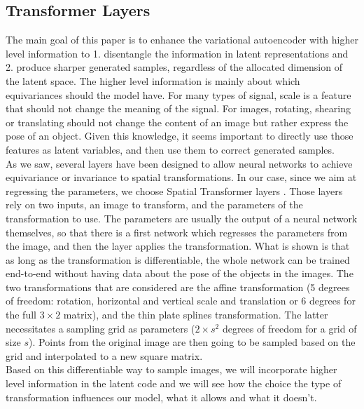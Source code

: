 \documentclass[letterpaper, twoside]{article}
\begin{document}
  \subsection{Transformer Layers}
    The main goal of this paper is to enhance the variational autoencoder with higher level information to 1. disentangle the information in latent representations and 2. produce sharper generated samples, regardless of the allocated dimension of the latent space. The higher level information is mainly about which equivariances should the model have. For many types of signal, scale is a feature that should not change the meaning of the signal. For images, rotating, shearing or translating should not change the content of an image but rather express the pose of an object. Given this knowledge, it seems important to directly use those features as latent variables, and then use them to correct generated samples.\\

    As we saw, several layers have been designed to allow neural networks to achieve equivariance or invariance to spatial transformations. In our case, since we aim at regressing the parameters, we choose Spatial Transformer layers \cite{Jaderberg.stn}. Those layers rely on two inputs, an image to transform, and the parameters of the transformation to use. The parameters are usually the output of a neural network themselves, so that there is a first network which regresses the parameters from the image, and then the layer applies the transformation. What is shown is that as long as the transformation is differentiable, the whole network can be trained end-to-end without having data about the pose of the objects in the images. The two transformations that are considered are the affine transformation (5 degrees of freedom: rotation, horizontal and vertical scale and translation or 6 degrees for the full $3\times 2$ matrix), and the thin plate splines transformation. The latter necessitates a sampling grid as parameters ($2 \times s^2$ degrees of freedom for a grid of size $s$). Points from the original image are then going to be sampled based on the grid and interpolated to a new square matrix.\\

    Based on this differentiable way to sample images, we will incorporate higher level information in the latent code and we will see how the choice the type of transformation influences our model, what it allows and what it doesn't.
\end{document}
